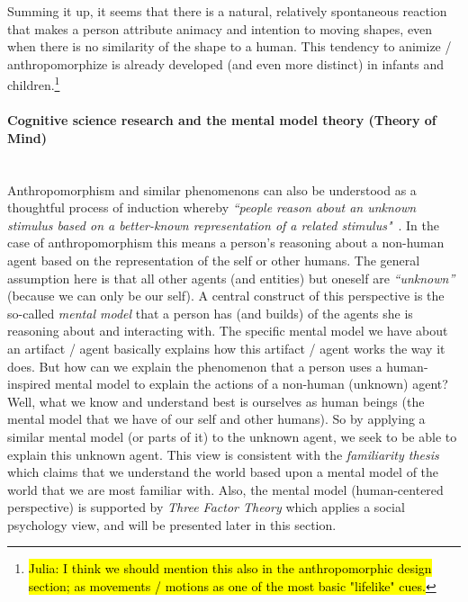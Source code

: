 \documentclass{frontiersSCNS} %
\begin{document}
Summing it up, it seems that there is a natural, relatively spontaneous reaction that makes a person attribute animacy and intention to moving shapes, even when there is no similarity of the shape to a human. This tendency to animize / anthropomorphize is already developed (and even more distinct) in infants and children.\footnote{\hl{Julia: I think we should mention this also in the anthropomorphic design section; as movements / motions as one of the most basic "lifelike" cues.}}


\paragraph*{Cognitive science research and the mental model theory (Theory of Mind)\\ \\}

Anthropomorphism and similar phenomenons can also be understood as a thoughtful process of induction whereby \textit{``people reason about an unknown stimulus based on a better-known representation of a related stimulus"}~\citep{epley_when_2008}. In the case of anthropomorphism this means a person's reasoning about a non-human agent based on the representation of the self or other humans. The general assumption here is that all other agents (and entities) but oneself are \textit{``unknown''} (because we can only be our self). A central construct of this perspective is the so-called \textit{mental model} that a person has (and builds) of the agents she is reasoning about and interacting with. The specific mental model we have about an artifact / agent basically explains how this artifact / agent works the way it does. But how can we explain the phenomenon that a person uses a human-inspired mental model to explain the actions of a non-human (unknown) agent? Well, what we know and understand best is ourselves as human beings (the mental model that we have of our self and other humans). So by applying a similar mental model (or parts of it) to the unknown agent, we seek to be able to explain this unknown agent.
This view is consistent with the \emph{familiarity thesis}~\citep{hegel_understanding_2008} which claims that we understand the world based upon a mental model of the world that we are most familiar with. Also, the mental model (human-centered perspective) is supported by \cite{epley_seeing_2007} \textit{Three Factor Theory} which applies a social psychology view, and will be presented later in this section.
\end{document}
